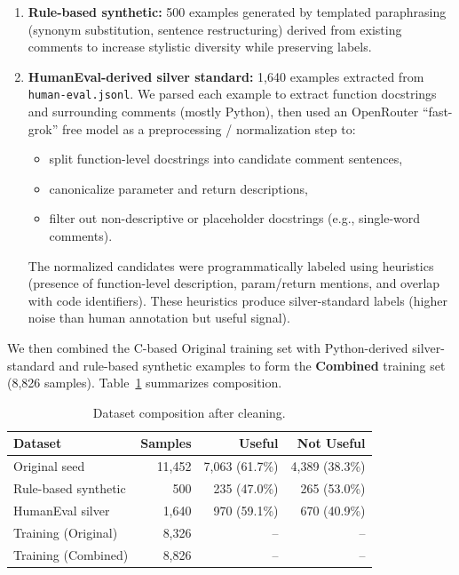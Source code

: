 \documentclass[runningheads]{ceurart}
\begin{document}
\begin{enumerate}
  \item \textbf{Rule-based synthetic:} 500 examples generated by templated paraphrasing (synonym substitution, sentence restructuring) derived from existing comments to increase stylistic diversity while preserving labels.
  \item \textbf{HumanEval-derived silver standard:} 1,640 examples extracted from \texttt{human-eval.jsonl}. We parsed each example to extract function docstrings and surrounding comments (mostly Python), then used an OpenRouter ``fast-grok'' free model as a preprocessing / normalization step to:
    \begin{itemize}
      \item split function-level docstrings into candidate comment sentences,
      \item canonicalize parameter and return descriptions,
      \item filter out non-descriptive or placeholder docstrings (e.g., single-word comments).
    \end{itemize}
  The normalized candidates were programmatically labeled using heuristics (presence of function-level description, param/return mentions, and overlap with code identifiers). These heuristics produce silver-standard labels (higher noise than human annotation but useful signal).
\end{enumerate}

We then combined the C-based Original training set with Python-derived silver-standard and rule-based synthetic examples to form the \textbf{Combined} training set (8,826 samples). Table~\ref{tab:data-stats} summarizes composition.

\begin{table}[h]
    \centering
    \caption{Dataset composition after cleaning.}
    \label{tab:data-stats}
    \small
    \begin{tabular}{lrrr}
        \toprule
        Dataset & Samples & Useful & Not Useful \\
        \midrule
        Original seed & 11,452 & 7,063 (61.7\%) & 4,389 (38.3\%) \\
        Rule-based synthetic & 500 & 235 (47.0\%) & 265 (53.0\%) \\
        HumanEval silver & 1,640 & 970 (59.1\%) & 670 (40.9\%) \\
        \midrule
        Training (Original) & 8,326 & -- & -- \\
        Training (Combined) & 8,826 & -- & -- \\
        \bottomrule
    \end{tabular}
\end{table}
\end{document}
